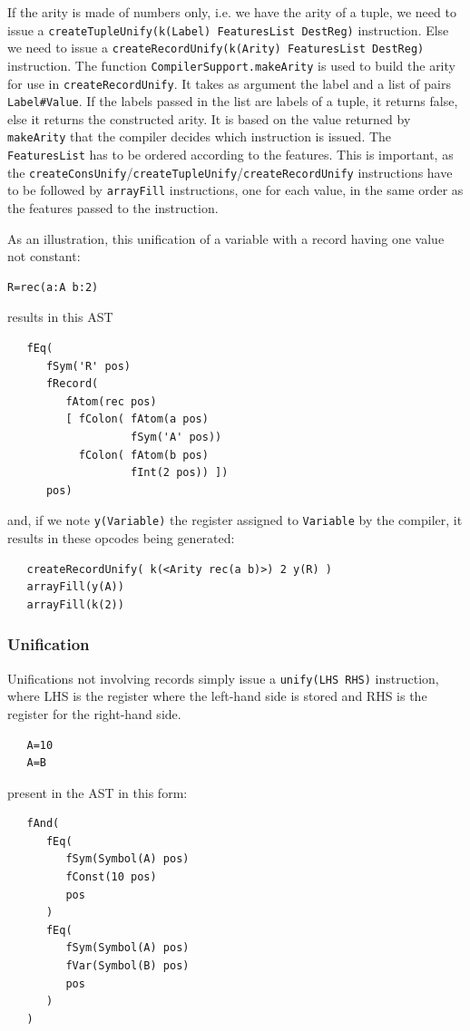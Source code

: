 \documentclass[a4paper]{memoir}
\begin{document}
If the arity is made of numbers only, i.e. we have the arity of a tuple, we need
to issue a \lstinline!createTupleUnify(k(Label) FeaturesList DestReg)!
instruction. Else we need to issue a \lstinline!createRecordUnify(k(Arity) FeaturesList DestReg)! instruction.
The function \lstinline!CompilerSupport.makeArity! is used to build the arity
for use in \lstinline!createRecordUnify!. It takes as argument the label and a list of pairs \lstinline!Label#Value!. If the labels passed in the list are labels of a tuple, it returns false, else it returns the constructed arity. It is based on the value returned by \lstinline!makeArity! that the compiler decides which instruction is issued.
The \lstinline!FeaturesList! has to be ordered according to the features. This
is important, as the
\lstinline!createConsUnify!/\lstinline!createTupleUnify!/\lstinline!createRecordUnify! instructions have to be followed by \lstinline!arrayFill! instructions, one for each value, in the same order as the features passed to the instruction.

As an illustration, this unification of a variable with a record having one value not constant:
\begin{lstlisting}
R=rec(a:A b:2)
\end{lstlisting}
results in this AST
\begin{lstlisting}
   fEq(
      fSym('R' pos)
      fRecord(
         fAtom(rec pos)
         [ fColon( fAtom(a pos)
                   fSym('A' pos))
           fColon( fAtom(b pos)
                   fInt(2 pos)) ])
      pos)
\end{lstlisting}
and, if we note \lstinline!y(Variable)! the register assigned to \lstinline!Variable! by the compiler, it results in these opcodes being generated:

\begin{lstlisting}
   createRecordUnify( k(<Arity rec(a b)>) 2 y(R) )
   arrayFill(y(A))
   arrayFill(k(2)) 
\end{lstlisting}

\subsubsection{Unification}
Unifications not involving records simply issue a \lstinline!unify(LHS RHS)! instruction, where LHS is the register where the left-hand side is stored and RHS is the register for the right-hand side.
\begin{lstlisting}
   A=10
   A=B
\end{lstlisting}
present in the AST in this form:
\begin{lstlisting}
   fAnd(
      fEq(
         fSym(Symbol(A) pos)
         fConst(10 pos)
         pos
      )
      fEq(
         fSym(Symbol(A) pos)
         fVar(Symbol(B) pos)
         pos
      )
   )
\end{lstlisting}
\end{document}
